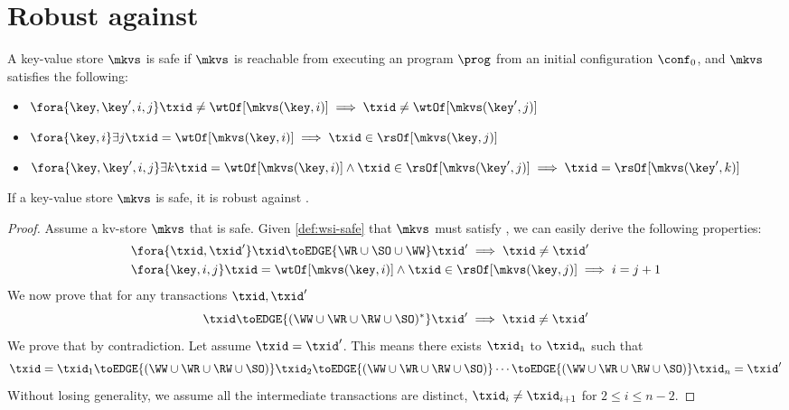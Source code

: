 \section{Robust against \WSI}
\begin{definition}
    \label{def:wsi-safe}
    A key-value store \( \mkvs \) is \WSI safe if \( \mkvs \) is 
    reachable from executing an program \( \prog \) from an initial configuration \( \conf_0 \),
    and \( \mkvs \) satisfies the following:
    \begin{itemize}
        \item \( \fora{\key, \key',i,j} \txid \neq \wtOf[\mkvs(\key,i)] \implies \txid \neq \wtOf[\mkvs(\key',j)] \)
        \item \( \fora{\key,i} \exists{j} \txid = \wtOf[\mkvs(\key,i)] \implies \txid \in \rsOf[\mkvs(\key,j)] \)
        \item \( \fora{\key,\key',i, j} \exists{k} \txid = \wtOf[\mkvs(\key,i)] \land \txid \in \rsOf[\mkvs(\key',j)] 
            \implies \txid = \rsOf[\mkvs(\key',k)] \)
    \end{itemize}
\end{definition}


\begin{theorem}
    If a key-value store \( \mkvs \) is \WSI safe, it is robust against \WSI.
\end{theorem}
\begin{proof}
    Assume a kv-store \( \mkvs \) that is \WSI safe.
    Given \cref{def:wsi-safe} that \( \mkvs \) must satisfy \WSI, we can easily derive the following properties:
    \begin{align}
        & \fora{\txid, \txid'} \txid \toEDGE{\WR \cup \SO \cup \WW}  \txid' \implies \txid \neq \txid' \label{equ:acyclic-wsi}\\
        & \fora{\key,i,j} \txid = \wtOf[\mkvs(\key,i)] \land \txid \in \rsOf[\mkvs(\key,j)] \implies i = j + 1 \label{equ:wsi-sat-ua} 
    \end{align}
    We now prove that for any transactions \( \txid, \txid'\)
    \[
        \txid \toEDGE{(\WW \cup \WR \cup \RW \cup \SO)^*} \txid' \implies \txid \neq \txid'
    \]
    We prove that by contradiction.
    Let assume \( \txid = \txid' \).
    This means there exists \( \txid_1 \) to \( \txid_n \)  such that
    \[
        \txid = \txid_1 \toEDGE{(\WW \cup \WR \cup \RW \cup \SO)} \txid_2 
        \toEDGE{(\WW \cup \WR \cup \RW \cup \SO)} \cdots \toEDGE{(\WW \cup \WR \cup \RW \cup \SO)} \txid_n  = \txid'
    \]
    Without losing generality, we assume all the intermediate transactions are distinct, \( \txid_i \neq \txid_{i+1}\) for \( 2 \leq i \leq n-2 \).
\end{proof}

